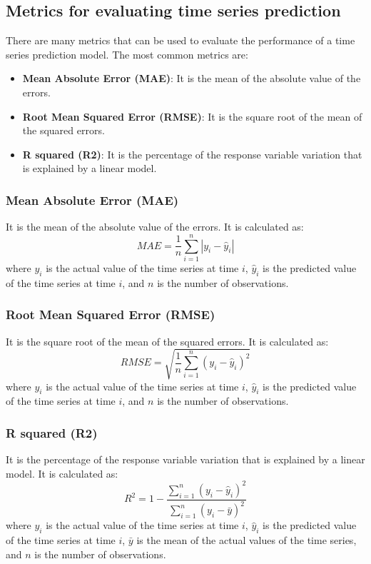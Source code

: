 \documentclass[manuscript,screen,nonacm]{acmart}
\numberwithin{equation}{section}
\begin{document}
\subsection{Metrics for evaluating time series prediction}
\label{sec:metrics}
There are many metrics that can be used to evaluate the performance of a time series prediction model. The most common metrics are:
\begin{itemize}
\item \textbf{Mean Absolute Error (MAE)}: It is the mean of the absolute value of the errors. 
\item \textbf{Root Mean Squared Error (RMSE)}: It is the square root of the mean of the squared errors. 
\item \textbf{R squared (R2)}: It is the percentage of the response variable variation that is explained by a linear model. 
\end{itemize}

\subsubsection{Mean Absolute Error (MAE)}
It is the mean of the absolute value of the errors. It is calculated as:
\begin{equation}
\label{eq:mae}
MAE = \frac{1}{n}\sum_{i=1}^{n} |y_i - \hat{y}_i|
\end{equation}
where $y_i$ is the actual value of the time series at time $i$, $\hat{y}_i$ is the predicted value of the time series at time $i$, and $n$ is the number of observations.

\subsubsection{Root Mean Squared Error (RMSE)}
It is the square root of the mean of the squared errors. It is calculated as:
\begin{equation}
\label{eq:rmse}
RMSE = \sqrt{\frac{1}{n}\sum_{i=1}^{n} (y_i - \hat{y}_i)^2}
\end{equation}
where $y_i$ is the actual value of the time series at time $i$, $\hat{y}_i$ is the predicted value of the time series at time $i$, and $n$ is the number of observations.

\subsubsection{R squared (R2)}
It is the percentage of the response variable variation that is explained by a linear model. It is calculated as:
\begin{equation}
\label{eq:r2}
R^2 = 1 - \frac{\sum_{i=1}^{n} (y_i - \hat{y}_i)^2}{\sum_{i=1}^{n} (y_i - \bar{y})^2}
\end{equation}
where $y_i$ is the actual value of the time series at time $i$, $\hat{y}_i$ is the predicted value of the time series at time $i$, $\bar{y}$ is the mean of the actual values of the time series, and $n$ is the number of observations.
\end{document}

